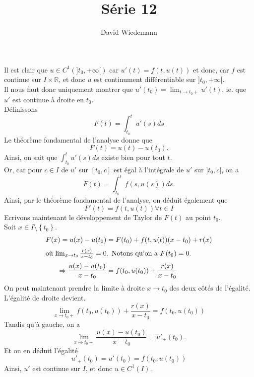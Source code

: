 \documentclass[11pt, a4paper]{article}
\begin{document}
\title{Série 12}
\author{David Wiedemann}
\maketitle
Il est clair que $u \in C^{1}( ] t_0, + \infty[  ) $ car $u'( t) = f( t, u( t) ) $ et donc, car $f$ est continue sur $I \times \mathbb{R}$, et donc $u$ est continument différentiable sur $]t_0, + \infty [  $.\\
Il nous faut donc uniquement montrer que $ u'( t_0) = \lim_{t \to t_0 +} u'( t) $, ie. que $u'$ est continue à droite en $t_0$.\\
Définissons 
\[ 
	F( t) = \int_{ t_0 }^{ t }u'( s) ds
\]
Le théorème fondamental de l'analyse donne que
\[ 
	F( t) = u( t) - u( t_0) .
\]
Ainsi, on sait que $ \int_{ t_0 }^{ t }u'( s) ds$ existe bien pour tout $t$.\\
Or, car pour $c \in  I$ de $u'$ sur $[t_0, c] $ est égal à l'intégrale de $u'$ sur $]t_0,c]$, on a
\[ 
	F( t) = \int_{ t_0 }^{ t }f( s,u( s) ) ds.
\]
Ainsi, par le théorème fondamental de l'analyse, on déduit également que
\[ 
	F'( t) = f( t,u( t) ) \forall t \in I
\]
Ecrivons maintenant le développement de Taylor de $F( t) $ au point $t_0$.\\
Soit $x \in I \setminus \left\{ t_0 \right\} $.
\begin{align*}
	F(x)= u( x) - u( t_0) &= F( t_0) + f( t, u( t) )  ( x- t_0 ) + r( x) \\
\intertext{où  $ \lim_{x \to t_0} \frac{r( x) }{x-t_0}= 0$.
	 Notons qu'on a  $F( t_0) = 0$.}
	\Rightarrow \frac{u( x) - u( t_0)}{x-t_0} &= f( t_0,u( t_0) ) + \frac{r( x) }{x-t_0}
\end{align*}
On peut maintenant prendre la limite à droite $x \to t_0$ des deux côtés de l'égalité.\\
L'égalité de droite devient.
\[ 
	\lim_{x \to t_0+ }  f( t_0, u( t_0) )  + \frac{r( x) }{x-t_0} = f( t_0, u( t_0) ) 
\]
Tandis qu'à gauche, on a 
\[ 
	\lim_{x \to t_0 +}  \frac{u( x) - u( t_0) }{ x-t_0} = u'_+( t_0).
\]
Et on en déduit l'égalité
\[ 
	u'_+ ( t_0) = u'( t_0) = f( t_0,u( t_0) ) 
\]
Ainsi, $u'$ est continue sur $I$, et donc $u \in C^{1}( I) $.
\end{document}
